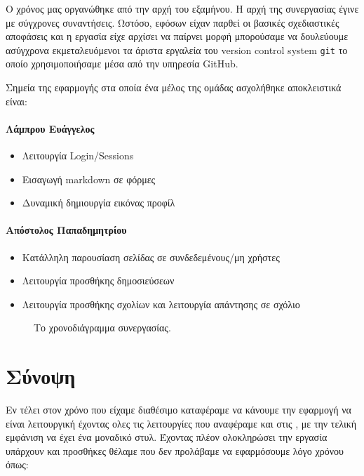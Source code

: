 \documentclass[nonacm, language=english, language=greek]{acmart}
\newcommand{\en}[1]{\textlatin{#1}}
\newcommand{\src}[1]{\texttt{\en{#1}}}
\begin{document}
Ο χρόνος μας οργανώθηκε από την αρχή του εξαμήνου. Η αρχή της συνεργασίας έγινε
με σύγχρονες συναντήσεις. Ωστόσο, εφόσων είχαν παρθεί οι βασικές σχεδιαστικές
αποφάσεις και η εργασία είχε αρχίσει να παίρνει μορφή μπορούσαμε να δουλεύουμε
ασύγχρονα εκμεταλευόμενοι τα άριστα εργαλεία του \en{version control system}
\src{git} \cite{git} το οποίο χρησιμοποιήσαμε μέσα από την υπηρεσία
\en{GitHub}.

Σημεία της εφαρμογής στα οποία ένα μέλος της ομάδας ασχολήθηκε
αποκλειστικά είναι: 

\paragraph{Λάμπρου Ευάγγελος}
\begin{itemize}
    \item Λειτουργία \en{Login/Sessions}
    \item Εισαγωγή \en{markdown} σε φόρμες
    \item Δυναμική δημιουργία εικόνας προφίλ
\end{itemize}

\paragraph{Απόστολος Παπαδημητρίου}
\begin{itemize}
    \item Κατάλληλη παρουσίαση σελίδας σε συνδεδεμένους/μη χρήστες
    \item Λειτουργία προσθήκης δημοσιεύσεων
    \item Λειτουργία προσθήκης σχολίων και 
        λειτουργία απάντησης σε σχόλιο
\end{itemize}

\begin{figure}[!htb]
\begin{center}
    
\end{center}
    \caption{Το χρονοδιάγραμμα συνεργασίας.}
\end{figure}


\section{Σύνοψη}

Εν τέλει στον χρόνο που είχαμε διαθέσιμο καταφέραμε να κάνουμε την εφαρμογή να είναι λειτουργική έχοντας ολες τις λειτουργίες που αναφέραμε και στις , με την τελική εμφάνιση να έχει ένα μοναδικό στυλ.
Έχοντας πλέον ολοκληρώσει την εργασία υπάρχουν και προσθήκες θέλαμε που δεν προλάβαμε να εφαρμόσουμε λόγο χρόνου όπως:
\end{document}

